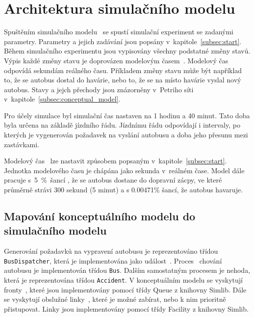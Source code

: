 \documentclass[a4paper]{article}
\begin{document}
    \section{Architektura simulačního modelu}
    \label{sec:architecture}

        Spuštěním simulačního modelu~\cite[snímek 44]{IMS_slides} se spustí simulační experiment se zadanými parametry.
        Parametry a jejich zadávání jsou popsány v~kapitole~\ref{subsec:start}. Během simulačního experimentu jsou vypisovány všechny podstatné změny stavů.
        Výpis každé změny stavu je doprovázen modelovým časem~\cite[snímek 21]{IMS_slides}. Modelový čas odpovídá sekundám reálného času. Příkladem změny stavu může být například to, že se autobus dostal do havárie, nebo to, že se na místo havárie vyslal nový autobus. Stavy a jejch přechody jsou znázorněny v~Petriho síti v~kapitole~\ref{subsec:conceptual_model}.

		Pro účely simulace byl simulační čas nastaven na 1 hodinu a 40 minut. Tato doba byla určena na základě jízdního řádu. Jízdnímu řádu odpovídají i intervaly, po kterých je vygenerován požadavek na vyslání autobusu a doba jeho přesunu mezi zastávkami.

        Modelový čas~\cite[snímek 21]{IMS_slides} lze nastavit způsobem popsaným v~kapitole~\ref{subsec:start}. Jednotka modelového času je chápána jako
        sekunda v~reálném čase.
        Model dále pracuje s~5~\%~šancí , že se autobus dostane do dopravní zácpy, ve které průměrně strávi 300 sekund (5 minut) a s 0.00471\% šancí, že autobus havaruje.

        \subsection{Mapování konceptuálního modelu do simulačního modelu}
        \label{subsec:mapping}

            Generování požadavků na vypravení autobusu je reprezentováno třídou \texttt{BusDispatcher}, která je implementována jako
            událost~\cite[snímek 172]{IMS_slides}. Proces~\cite[snímek 174]{IMS_slides} chování autobusu je implementován třídou \texttt{Bus}. Dalším samostatným procesem je nehoda, která je reprezentována třídou \texttt{Accident}. V konceptuálním modelu se vyskytují fronty~\cite[snímek 141]{IMS_slides}, které jsou implementovány pomocí třídy Queue z knihovny Simlib. Dále se vyskytují obslužné linky~\cite[snímek 62]{IMS_slides}, které je možné zabírat, nebo k nim prioritně přistupovat. Linky jsou implementovány pomocí třídy Facility z knihovny Simlib.
\end{document}
